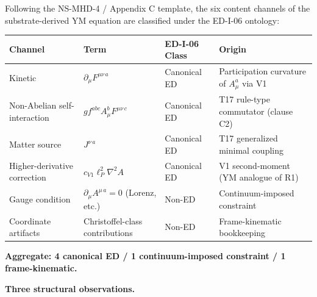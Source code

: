 \documentclass[
  11pt,a4paper]{article}
\newcounter{none} %
\begin{document}
Following the NS-MHD-4 / Appendix C template, the six content channels
of the substrate-derived YM equation are classified under the ED-I-06
ontology:

{\def\LTcaptype{none} %
\begin{longtable}[]{@{}
  >{\raggedright\arraybackslash}p{}
  >{\raggedright\arraybackslash}p{}
  >{\raggedright\arraybackslash}p{}
  >{\raggedright\arraybackslash}p{}@{}}
\toprule\noalign{}
\begin{minipage}[b]{\linewidth}\raggedright
Channel
\end{minipage} & \begin{minipage}[b]{\linewidth}\raggedright
Term
\end{minipage} & \begin{minipage}[b]{\linewidth}\raggedright
ED-I-06 Class
\end{minipage} & \begin{minipage}[b]{\linewidth}\raggedright
Origin
\end{minipage} \\
\midrule\noalign{}
\endhead
\bottomrule\noalign{}
\endlastfoot
Kinetic & \(\partial_\mu F^{\mu\nu\,a}\) & Canonical ED & Participation
curvature of \(A_\mu^a\) via V1 \\
Non-Abelian self-interaction & \(gf^{abc}A_\mu^b F^{\mu\nu\,c}\) &
Canonical ED & T17 rule-type commutator (clause C2) \\
Matter source & \(J^{\nu\,a}\) & Canonical ED & T17 generalized minimal
coupling \\
Higher-derivative correction & \(c_{V1}\ell_P^2\nabla^2 A\) & Canonical
ED & V1 second-moment (YM analogue of R1) \\
Gauge condition & \(\partial_\mu A^{\mu\,a} = 0\) (Lorenz, etc.) &
Non-ED & Continuum-imposed constraint \\
Coordinate artifacts & Christoffel-class contributions & Non-ED &
Frame-kinematic bookkeeping \\
\end{longtable}
}

\textbf{Aggregate: 4 canonical ED / 1 continuum-imposed constraint / 1
frame-kinematic.}

\textbf{Three structural observations.}
\end{document}
